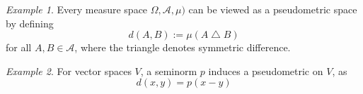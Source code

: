 \documentclass{article}
\theoremstyle{definition}
\theoremstyle{remark}
\theoremstyle{remark}
\theoremstyle{example}
\newtheorem{example}{Example}
\begin{document}
\begin{example}
Every measure space $\Omega,\mathcal{A},\mu)$ can be viewed as a pseudometric space by defining
\[
d(A,B) := \mu(A \bigtriangleup B)
\]
for all $A,B \in \mathcal{A}$, where the triangle denotes symmetric difference.
\end{example}

\begin{example}
For vector spaces $V$, a seminorm $p$ induces a pseudometric on $V$, as
\[
d(x,y) = p(x - y)
\]
\end{example}
\end{document}
